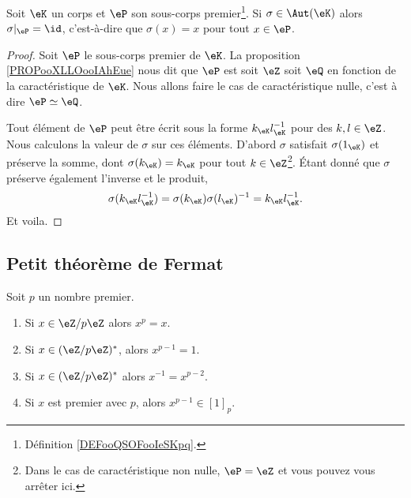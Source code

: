 \begin{proposition}     \label{PropqPPrgJ}
	Soit \( \eK\) un corps et \( \eP\) son sous-corps premier\footnote{Définition \ref{DEFooQSOFooIeSKpq}.}. Si \( \sigma\in\Aut(\eK)\) alors \( \sigma|_{\eP}=\id\), c'est-à-dire que \( \sigma(x)=x\) pour tout \( x\in \eP\).
\end{proposition}

\begin{proof}
	Soit \( \eP\) le sous-corps premier de \( \eK\). La proposition \ref{PROPooXLLOooIAhEue} nous dit que \( \eP\) est soit \( \eZ\) soit \( \eQ\) en fonction de la caractéristique de \( \eK\). Nous allons faire le cas de caractéristique nulle, c'est à dire \( \eP\simeq \eQ\).

	Tout élément de \( \eP\) peut être écrit sous la forme \( k_{\eK}l_{\eK}^{-1}\) pour des \( k,l\in \eZ\). Nous calculons la valeur de \( \sigma\) sur ces éléments. D'abord \( \sigma\) satisfait \( \sigma(1_{\eK})\) et préserve la somme, dont \( \sigma(k_{\eK})=k_{\eK}\) pour tout \( k\in \eZ\)\footnote{Dans le cas de caractéristique non nulle, \( \eP=\eZ\) et vous pouvez vous arrêter ici.}. Étant donné que \( \sigma\) préserve également l'inverse et le produit,
	\begin{equation}
		\sigma(k_{\eK}l_{\eK}^{-1})=\sigma(k_{\eK})\sigma(l_{\eK})^{-1}=k_{\eK}l_{\eK}^{-1}.
	\end{equation}
	Et voila.
\end{proof}

\subsection{Petit théorème de Fermat}

\begin{theorem}       \label{ThoOPQOiO}
	Soit \( p\) un nombre premier.
	\begin{enumerate}
		\item
		      Si \( x\in \eZ/p\eZ\) alors \( x^p=x\).
		\item
		      Si \( x\in(\eZ/p\eZ)^*\), alors \( x^{p-1}=1\).
		\item
		      Si \( x\in (\eZ/p\eZ)^*\) alors \( x^{-1}=x^{p-2}\).
		\item       \label{ITEMooRNIVooOIzqgc}
		      Si \( x\) est premier avec \( p\), alors \( x^{p-1}\in [1]_p\).
	\end{enumerate}
\end{theorem}

